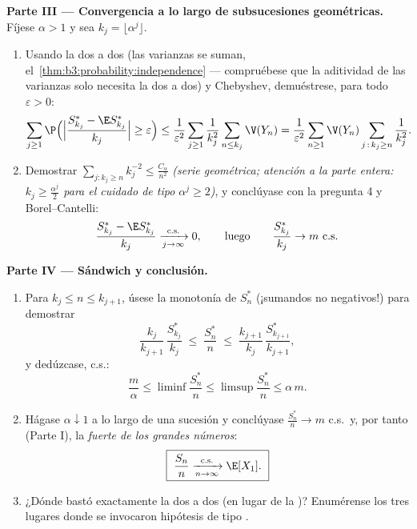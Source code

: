 \begin{problem}
\medskip
\noindent\textbf{Parte III --- Convergencia a lo largo de subsucesiones
geométricas.} Fíjese $\alpha > 1$ y sea $k_j =
\lfloor\alpha^j\rfloor$.
\begin{enumerate}[resume]
  \item Usando la
   dos a dos (las
  varianzas se suman, el~\cref{thm:b3:probability:independence} ---
  compruébese que la aditividad de las varianzas solo necesita la
   dos a dos) y
  Chebyshev, demuéstrese, para todo
        $\varepsilon > 0$:
        \[
        \sum_{j\geq1}\P\Bigl(\Bigl|
        \frac{S^*_{k_j} - \E S^*_{k_j}}{k_j}\Bigr| \geq
        \varepsilon\Bigr)
        \leq
        \frac1{\varepsilon^2}\sum_{j\geq1}\frac1{k_j^2}
        \sum_{n\leq k_j}\V(Y_n)
        = \frac1{\varepsilon^2}\sum_{n\geq1}\V(Y_n)
        \sum_{j\,:\,k_j\geq n}\frac1{k_j^2} .
        \]
  \item Demostrar $\sum_{j : k_j \geq n}k_j^{-2} \leq
        \frac{C_\alpha}{n^2}$ \emph{(serie geométrica; atención a la
  parte entera: $k_j \geq \frac{\alpha^j}2$ para el cuidado de tipo
  $\alpha^j \geq 2$)}, y conclúyase con la pregunta 4 y Borel--Cantelli:
        \[
        \frac{S^*_{k_j} - \E S^*_{k_j}}{k_j}
        \xrightarrow[j\to\infty]{\text{c.s.}} 0,
        \qquad\text{luego}\qquad
        \frac{S^*_{k_j}}{k_j} \to m \ \text{c.s.}
        \]
\end{enumerate}

\medskip
\noindent\textbf{Parte IV --- Sándwich y conclusión.}
\begin{enumerate}[resume]
  \item Para $k_j \leq n \leq k_{j+1}$, úsese la monotonía de $S^*_n$
  (¡sumandos no negativos!) para demostrar
        \[
        \frac{k_j}{k_{j+1}}\,\frac{S^*_{k_j}}{k_j}
        \;\leq\; \frac{S^*_n}{n} \;\leq\;
        \frac{k_{j+1}}{k_j}\,\frac{S^*_{k_{j+1}}}{k_{j+1}},
        \]
        y dedúzcase, c.s.:
        \[
        \frac m\alpha \leq \liminf\frac{S^*_n}n \leq
        \limsup\frac{S^*_n}n \leq \alpha\,m .
        \]
  \item Hágase $\alpha \downarrow 1$ a lo largo de una sucesión y
  conclúyase $\frac{S_n^*}n \to m$ c.s.\ y, por tanto (Parte I), la
  \emph{ fuerte de los grandes
  números}:
        \[
        \boxed{\ \frac{S_n}{n}
        \xrightarrow[n\to\infty]{\text{c.s.}} \E[X_1].\ }
        \]
  \item ¿Dónde bastó exactamente la
   dos a dos (en
  lugar de la 
  )? Enumérense los tres lugares donde se invocaron hipótesis de
  tipo .
\end{enumerate}


\end{problem}
